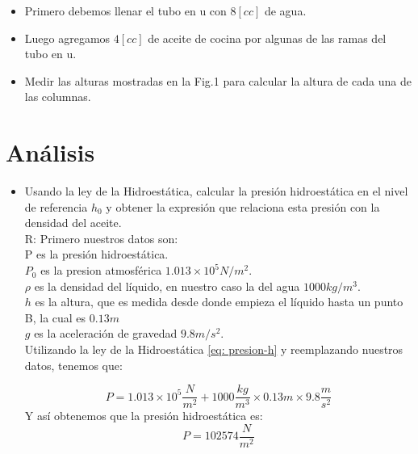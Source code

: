 \documentclass[a4paper, 12p]{article}
\begin{document}
\begin{itemize}
      \item Primero debemos llenar el tubo en u con $8[cc]$ de agua.
      
      \item Luego agregamos $4[cc]$ de aceite de cocina por algunas de las ramas del tubo en u.
      
      \item Medir las alturas mostradas en la Fig.1 para calcular la altura de cada una de las columnas.
      
\end{itemize}

\section{Análisis}
\begin{itemize}
      \item Usando la ley de la Hidroestática, calcular la presión hidroestática en el nivel de referencia $h_{0}$ y obtener la expresión que relaciona esta presión con la densidad del aceite.\\ 
      R: Primero nuestros datos son:\\
      P es la presión hidroestática.\\
      $P_{0}$ es la presion atmosférica $1.013 \times 10^5 N/m^2$.\\
      $\rho$ es la densidad del líquido, en nuestro caso la del agua $1000 kg/m^3$.\\
      $h$ es la altura, que es medida desde donde empieza el líquido hasta un punto B, la cual es $0.13m$\\
      $g$ es la aceleración de gravedad $9.8 m/s^2$.\\
      
      Utilizando la ley de la Hidroestática \ref{eq: presion-h} y reemplazando nuestros datos, tenemos que:

       \begin{equation*}
       P = 1.013 \times 10^5\dfrac{N}{m^2} + 1000\dfrac{kg}{m^3} \times 0.13m \times 9.8\dfrac{m}{s^2}
       \end{equation*}
       Y así obtenemos que la presión hidroestática es: 
       \begin{equation*}
       P = 102574 \dfrac{N}{m^2}  
       \end{equation*}
      

\end{itemize}
\end{document}
